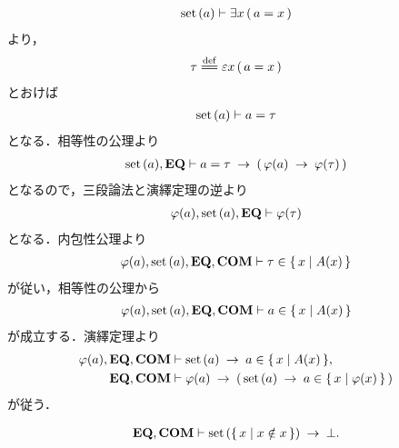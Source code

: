	\begin{sketch}
		\begin{align}
			\set{a} \vdash \exists x\, (\, a = x\, )
		\end{align}
		より，
		\begin{align}
			\tau \defeq \varepsilon x\, (\, a = x\, )
		\end{align}
		とおけば
		\begin{align}
			\set{a} \vdash a = \tau
		\end{align}
		となる．相等性の公理より
		\begin{align}
			\set{a},\EQAX \vdash 
			a = \tau \rarrow (\, \varphi(a) \rarrow \varphi(\tau)\, )
		\end{align}
		となるので，三段論法と演繹定理の逆より
		\begin{align}
			\varphi(a),\set{a},\EQAX \vdash \varphi(\tau)
		\end{align}
		となる．内包性公理より
		\begin{align}
			\varphi(a),\set{a},\EQAX,\COMAX \vdash \tau \in \Set{x}{A(x)}
		\end{align}
		が従い，相等性の公理から
		\begin{align}
			\varphi(a),\set{a},\EQAX,\COMAX \vdash a \in \Set{x}{A(x)}
		\end{align}
		が成立する．演繹定理より
		\begin{align}
			\varphi(a),\EQAX,\COMAX &\vdash \set{a} \rarrow a \in \Set{x}{A(x)}, \\
			\EQAX,\COMAX &\vdash \varphi(a) \rarrow 
			\left(\, \set{a} \rarrow a \in \Set{x}{\varphi(x)}\, \right)
		\end{align}
		が従う．
		\QED
	\end{sketch}
	
	\begin{screen}
		\begin{thm}[Russellのパラドックス]\label{thm:Russell_paradox}
			\begin{align}
				\EQAX,\COMAX \vdash \set{\Set{x}{x \notin x}} \rarrow \bot.
			\end{align}
		\end{thm}
	\end{screen}
	
